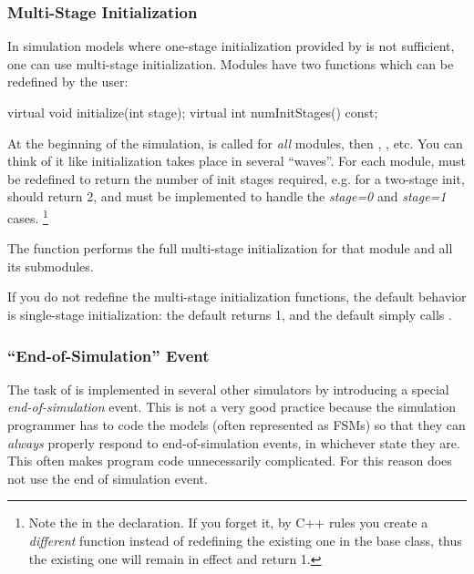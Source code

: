 \subsubsection{Multi-Stage Initialization}
\label{sec:simple-modules:multi-stage-init}

In simulation models where one-stage
initialization provided by 
is not sufficient, one can use multi-stage
initialization.  Modules have two
functions which can be redefined by the user:

\begin{cpp}
virtual void initialize(int stage);
virtual int numInitStages() const;
\end{cpp}

At the beginning of the simulation, 
is called for \textit{all} modules, then ,
, etc. You can think of it like
initialization takes place in several ``waves''. For each module,
 must be redefined to return the number of init
stages required, e.g. for a two-stage init, 
should return 2, and  must be implemented to
handle the \textit{stage=0} and \textit{stage=1} cases.
  \footnote{Note the  in the  declaration.
  If you forget it, by C++ rules you create a \textit{different} function
  instead of redefining the existing one in the base class, thus the
  existing one will remain in effect and return 1.}

The  function performs the full multi-stage initialization
for that module and all its submodules.

If you do not redefine the multi-stage initialization functions, the
default behavior is single-stage initialization: the default
 returns 1, and the default 
simply calls .


\subsubsection{``End-of-Simulation'' Event}
\label{sec:simple-modules:end-of-simulation-event}

The task of  is implemented in several other simulators
by introducing a special \textit{end-of-simulation} event.
This is not a very good practice because the simulation programmer has to
code the models (often represented as FSMs) so that they can \textit{always}
properly respond to end-of-simulation events, in whichever state they are. This
often makes program code unnecessarily complicated.
 For this reason {\opp} does not use the end of simulation event.

